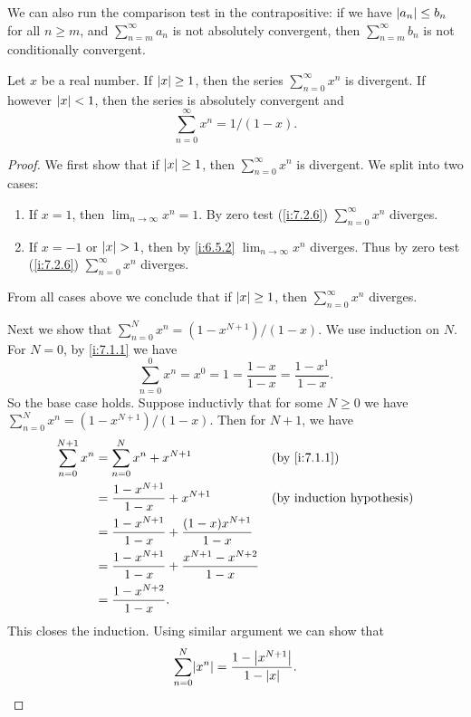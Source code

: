 \begin{note}
  We can also run the comparison test in the contrapositive:
  if we have \(\left\lvert a_n\right\rvert \leq b_n\) for all \(n \geq m\), and \(\sum_{n = m}^\infty a_n\) is not absolutely convergent, then \(\sum_{n = m}^\infty b_n\) is not conditionally convergent.
\end{note}

\begin{lem}\label{i:7.3.3}
  Let \(x\) be a real number.
  If \(\left\lvert x\right\rvert \geq 1\), then the series \(\sum_{n = 0}^\infty x^n\) is divergent.
  If however \(\left\lvert x\right\rvert < 1\), then the series is absolutely convergent and
  \[
    \sum_{n = 0}^\infty x^n = 1 / (1 - x).
  \]
\end{lem}

\begin{proof}
  We first show that if \(\left\lvert x\right\rvert \geq 1\), then \(\sum_{n = 0}^\infty x^n\) is divergent.
  We split into two cases:
  \begin{enumerate}
    \item If \(x = 1\), then \(\lim_{n \to \infty} x^n = 1\). By zero test (\cref{i:7.2.6}) \(\sum_{n = 0}^\infty x^n\) diverges.
    \item If \(x = -1\) or \(\left\lvert x\right\rvert > 1\), then by \cref{i:6.5.2} \(\lim_{n \to \infty} x^n\) diverges.
          Thus by zero test (\cref{i:7.2.6}) \(\sum_{n = 0}^\infty x^n\) diverges.
  \end{enumerate}
  From all cases above we conclude that if \(\left\lvert x\right\rvert \geq 1\), then \(\sum_{n = 0}^\infty x^n\) diverges.

  Next we show that \(\sum_{n = 0}^N x^n = (1 - x^{N + 1}) / (1 - x)\).
  We use induction on \(N\).
  For \(N = 0\), by \cref{i:7.1.1} we have
  \[
    \sum_{n = 0}^0 x^n = x^0 = 1 = \dfrac{1 - x}{1 - x} = \dfrac{1 - x^1}{1 - x}.
  \]
  So the base case holds.
  Suppose inductivly that for some \(N \geq 0\) we have \(\sum_{n = 0}^N x^n = (1 - x^{N + 1}) / (1 - x)\).
  Then for \(N + 1\), we have
  \begin{align*}
    \sum_{n = 0}^{N + 1} x^n & = \sum_{n = 0}^N x^n + x^{N + 1}                                      &  & \by{i:7.1.1} \\
                             & = \dfrac{1 - x^{N + 1}}{1 - x} + x^{N + 1}                            &  & \byIH        \\
                             & = \dfrac{1 - x^{N + 1}}{1 - x} + \dfrac{(1 - x) x^{N + 1}}{1 - x}                       \\
                             & = \dfrac{1 - x^{N + 1}}{1 - x} + \dfrac{x^{N + 1} - x^{N + 2}}{1 - x}                   \\
                             & = \dfrac{1 - x^{N + 2}}{1 - x}.
  \end{align*}
  This closes the induction.
  Using similar argument we can show that
  \[
    \sum_{n = 0}^N \abs{x^n} = \dfrac{1 - \abs{x^{N + 1}}}{1 - \abs{x}}.
  \]


\end{proof}
